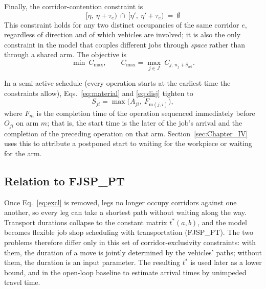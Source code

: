 Finally, the corridor-contention constraint is
\begin{equation}
\label{eq:excl}
\bigl[\eta,\ \eta+\tau_e\bigr)\ \cap\
\bigl[\eta',\ \eta'+\tau_e\bigr)\ =\ \emptyset
\end{equation}
This constraint holds for any two distinct occupancies of the same corridor $e$, regardless of direction and of which vehicles are involved; it is also the only constraint in the model that couples different jobs through \emph{space} rather than through a shared arm. The objective is
\begin{equation}
\label{eq:obj}
\min\ C_{\max},\qquad
C_{\max}=\max_{j\in J}\ C_{j,\,n_j+\delta_{\mathrm{ret}}} .
\end{equation}

In a semi-active schedule (every operation starts at the earliest time the constraints allow), Eqs.~\eqref{eq:material} and \eqref{eq:disj} tighten to
\begin{equation}
\label{eq:bind}
S_{ji}=\max\bigl(A_{ji},\ F_{\mathrm{m}(j,i)}\bigr),
\end{equation}
where $F_m$ is the completion time of the operation sequenced immediately before $O_{ji}$ on arm $m$; that is, the start time is the later of the job's arrival and the completion of the preceding operation on that arm. Section~\ref{sec:Chapter_IV} uses this to attribute a postponed start to waiting for the workpiece or waiting for the arm.

\subsection{Relation to FJSP\_PT}
\label{sec:fjsppt}

Once Eq.~\eqref{eq:excl} is removed, legs no longer occupy corridors against one another, so every leg can take a shortest path without waiting along the way. Transport durations collapse to the constant matrix $t^{*}(a,b)$,
and the model becomes flexible job shop scheduling with transportation (FJSP\_PT). The two problems therefore differ only in this set of corridor-exclusivity constraints: with them, the duration of a move is jointly determined by the vehicles' paths; without them, the duration is an input parameter.
The resulting $t^{*}$ is used later as a lower bound, and in the open-loop baseline to estimate arrival times by unimpeded travel time.

